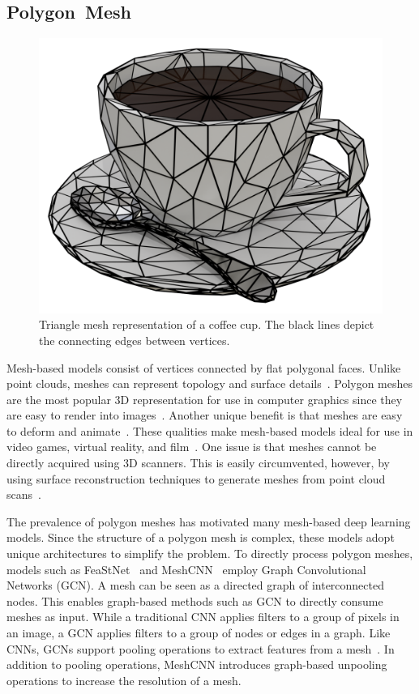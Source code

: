 \subsection{Polygon~Mesh}
\label{subsec:polygon_mesh}

\begin{figure}[h]
	\centering
	\includegraphics[scale=0.2]{Images/Mesh Cup}
	\caption{Triangle mesh representation of a coffee cup. The black lines depict the connecting edges between vertices.}
	\label{fig:mesh_cup}
\end{figure}

Mesh-based models consist of vertices connected by flat polygonal faces. Unlike point clouds, meshes can represent topology and surface details~\cite{Xiao2020}. Polygon meshes are the most popular 3D representation for use in computer graphics since they are easy to render into images~\cite{Watt1996}. Another unique benefit is that meshes are easy to deform and animate~\cite{Wang2018}. These qualities make mesh-based models ideal for use in video games, virtual reality, and film~\cite{Nash2020}. One issue is that meshes cannot be directly acquired using 3D scanners. This is easily circumvented, however, by using surface reconstruction techniques to generate meshes from point cloud scans~\cite{Yuan2022}.

The prevalence of polygon meshes has motivated many mesh-based deep learning models. Since the structure of a polygon mesh is complex, these models adopt unique architectures to simplify the problem. To directly process polygon meshes, models such as FeaStNet~\cite{Verma2018} and MeshCNN~\cite{Hanocka2019} employ Graph Convolutional Networks (GCN). A mesh can be seen as a directed graph of interconnected nodes. This enables graph-based methods such as GCN to directly consume meshes as input. While a traditional CNN applies filters to a group of pixels in an image, a GCN applies filters to a group of nodes or edges in a graph. Like CNNs, GCNs support pooling operations to extract features from a mesh~\cite{Verma2018}. In addition to pooling operations, MeshCNN introduces graph-based unpooling operations to increase the resolution of a mesh.

